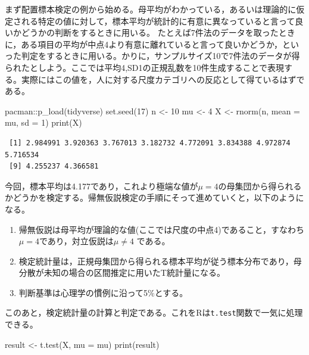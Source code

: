 \documentclass[
  a4paper,
]{ltjsbook}
\newenvironment{Shaded}{\begin{snugshade}}{\end{snugshade}}
\newcommand{\AttributeTok}[1]{\textcolor[rgb]{0.40,0.45,0.13}{#1}}
\newcommand{\DecValTok}[1]{\textcolor[rgb]{0.68,0.00,0.00}{#1}}
\newcommand{\FunctionTok}[1]{\textcolor[rgb]{0.28,0.35,0.67}{#1}}
\newcommand{\NormalTok}[1]{\textcolor[rgb]{0.00,0.23,0.31}{#1}}
\newcommand{\OtherTok}[1]{\textcolor[rgb]{0.00,0.23,0.31}{#1}}
\newcommand{\SpecialCharTok}[1]{\textcolor[rgb]{0.37,0.37,0.37}{#1}}
\providecommand{\tightlist}{%
  \setlength{\itemsep}{0pt}\setlength{\parskip}{0pt}}
\begin{document}
まず配置標本検定の例から始める。母平均がわかっている，あるいは理論的に仮定される特定の値に対して，標本平均が統計的に有意に異なっていると言って良いかどうかの判断をするときに用いる。
たとえば7件法のデータを取ったときに，ある項目の平均が中点4より有意に離れていると言って良いかどうか，といった判定をするときに用いる。かりに，サンプルサイズ10で7件法のデータが得られたとしよう。ここでは平均4,SD1の正規乱数を10件生成することで表現する。実際にはこの値を，人に対する尺度カテゴリへの反応として得ているはずである。

\begin{Shaded}
\begin{Highlighting}[]
\NormalTok{pacman}\SpecialCharTok{::}\FunctionTok{p\_load}\NormalTok{(tidyverse)}
\FunctionTok{set.seed}\NormalTok{(}\DecValTok{17}\NormalTok{)}
\NormalTok{n }\OtherTok{\textless{}{-}} \DecValTok{10}
\NormalTok{mu }\OtherTok{\textless{}{-}} \DecValTok{4}
\NormalTok{X }\OtherTok{\textless{}{-}} \FunctionTok{rnorm}\NormalTok{(n, }\AttributeTok{mean =}\NormalTok{ mu, }\AttributeTok{sd =} \DecValTok{1}\NormalTok{)}
\FunctionTok{print}\NormalTok{(X)}
\end{Highlighting}
\end{Shaded}

\begin{verbatim}
 [1] 2.984991 3.920363 3.767013 3.182732 4.772091 3.834388 4.972874 5.716534
 [9] 4.255237 4.366581
\end{verbatim}

今回，標本平均は4.177であり，これより極端な値が\(\mu = 4\)の母集団から得られるかどうかを検定する。帰無仮説検定の手順にそって進めていくと，以下のようになる。

\begin{enumerate}
\def\labelenumi{\arabic{enumi}.}
\tightlist
\item
  帰無仮説は母平均が理論的な値(ここでは尺度の中点4)であること，すなわち\(\mu =4\)であり，対立仮説は\(\mu \neq 4\)
  である。
\item
  検定統計量は，正規母集団から得られる標本平均が従う標本分布であり，母分散が未知の場合の区間推定に用いたT統計量になる。
\item
  判断基準は心理学の慣例に沿って5\%とする。
\end{enumerate}

このあと，検定統計量の計算と判定である。これをRは\texttt{t.test}関数で一気に処理できる。

\begin{Shaded}
\begin{Highlighting}[]
\NormalTok{result }\OtherTok{\textless{}{-}} \FunctionTok{t.test}\NormalTok{(X, }\AttributeTok{mu =}\NormalTok{ mu)}
\FunctionTok{print}\NormalTok{(result)}
\end{Highlighting}
\end{Shaded}
\end{document}
